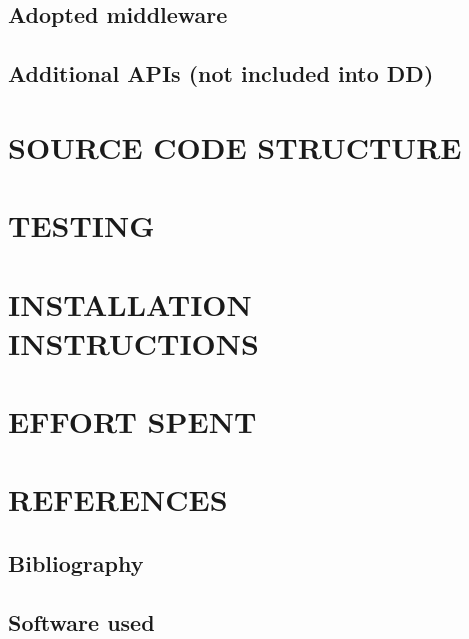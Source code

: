 \documentclass[11pt]{report}
\begin{document}
		\section{Adopted middleware}
		\label{sect:Adopted middleware}
			
		
		\section{Additional APIs (not included into DD)}
		\label{sect:Additional APIs (not included into DD)}
			
	
	\chapter{SOURCE CODE STRUCTURE}
	\label{ch:SOURCE CODE STRUCTURE}	
		
	
	\chapter{TESTING}
	\label{ch:TESTING}	
		
	
	\chapter{INSTALLATION INSTRUCTIONS}
	\label{ch:INSTALLATION INSTRUCTIONS}	
		
	
	\chapter{EFFORT SPENT}
	\label{ch:EFFORT SPENT}
		
		
	\chapter{REFERENCES}
	\label{ch:REFERENCES}
	
		\section{Bibliography}
		\label{sect: Bibliography}
		
		
		\section{Software used}
		\label{sect: Software used}
		
		
\end{document}
